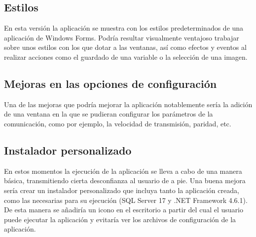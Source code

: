 \subsection{Estilos}

En esta versión la aplicación se muestra con los estilos predeterminados de una aplicación de Windows Forms. Podría resultar visualmente ventajoso trabajar sobre unos estilos con los que dotar a las ventanas, así como efectos y eventos al realizar acciones como el guardado de una variable o la selección de una imagen.

\subsection{Mejoras en las opciones de configuración}

Una de las mejoras que podría mejorar la aplicación notablemente sería la adición de una ventana en la que se pudieran configurar los parámetros de la comunicación, como por ejemplo, la velocidad de transmisión, paridad, etc.

\subsection{Instalador personalizado}

En estos momentos la ejecución de la aplicación se lleva a cabo de una manera básica, transmitiendo cierta desconfianza al usuario de a pie. Una buena mejora sería crear un instalador personalizado que incluya tanto la aplicación creada, como las necesarias para su ejecución (SQL Server 17 y .NET Framework 4.6.1). De esta manera se añadiría un icono en el escritorio a partir del cual el usuario puede ejecutar la aplicación y evitaría ver los archivos de configuración de la aplicación.